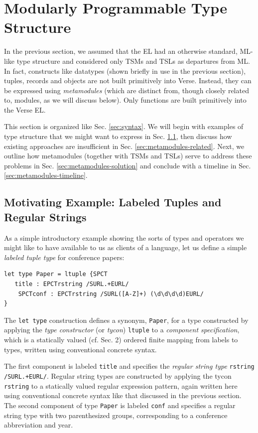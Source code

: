 
\section{Modularly Programmable Type Structure}\label{sec:metamodules}
In the previous section, we assumed that the EL had an otherwise standard, ML-like type structure and considered only TSMs and TSLs as departures from ML. In fact, constructs like datatypes (shown briefly in use in the previous section), tuples, records and objects are not built primitively into Verse. Instead, they can be expressed using \emph{metamodules} (which are distinct from, though closely related to, {modules}, as we will discuss below). Only  functions are built primitively into the Verse EL.

This section is organized like Sec. \ref{sec:syntax}. We will begin with examples of type structure that we might want to express in Sec. \ref{sec:metamodules-example}, then discuss how existing approaches are insufficient in Sec. \ref{sec:metamodules-related}. Next, we outline how {metamodules} (together with TSMs and TSLs) serve to address these problems in Sec. \ref{sec:metamodules-solution} and conclude with a timeline in Sec. \ref{sec:metamodules-timeline}.

\subsection{Motivating Example: Labeled Tuples and Regular Strings}\label{sec:metamodules-example}\label{sec:metamodules-motivating-examples}
As a simple introductory example showing the sorts of types and operators we might like to have available to us as clients of a language, let us define a simple \emph{labeled tuple type} for conference papers:
\begin{lstlisting}[numbers=none]
let type Paper = ltuple {SPCT
   title : EPCTrstring /SURL.+EURL/
    SPCTconf : EPCTrstring /SURL([A-Z]+) (\d\d\d\d)EURL/
}
\end{lstlisting}
The \lstinline{let type} construction defines a synonym, \lstinline{Paper}, for a type constructed by applying the \emph{type constructor} (or \emph{tycon}) \lstinline{ltuple} to a \emph{component specification}, which is a  statically valued (cf. Sec. 2) ordered finite mapping from labels to types, written using conventional concrete syntax.

The first component is labeled \lstinline{title} and specifies the \emph{regular string type} \lstinline{rstring /SURL.+EURL/}. Regular string types are constructed by applying the tycon \lstinline{rstring} to a statically valued regular expression pattern, again written here using conventional concrete syntax like that discussed in the previous section. The second component of type \lstinline{Paper} is labeled \lstinline{conf} and specifies a regular string type with two {parenthesized groups}, corresponding to a conference abbreviation and year. 

